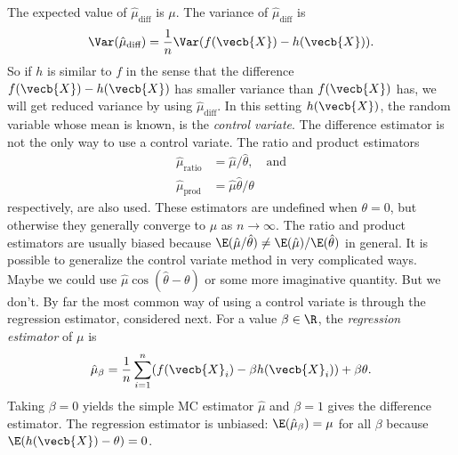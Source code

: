 The expected value of $\hat{\mu}_{\text{diff}}$ is $\mu$. The variance of $\hat{\mu}_{\text{diff}}$ is
\begin{equation}
	\Var(\hat{\mu}_{\text{diff}}) = \frac{1}{n} \Var(f(\vecb{X}) - h(\vecb{X})).
	\label{eq:DifferenceEstimatorVariance}
\end{equation}
So if $h$ is similar to $f$ in the sense that the difference $f(\vecb{X}) - h(\vecb{X})$ has smaller variance than $f(\vecb{X})$ has, we will get reduced variance by using $\hat{\mu}_{\text{diff}}$. In this setting $h(\vecb{X})$, the random variable whose mean is known, is the \textit{control variate}. The difference estimator is not the only way to use a control variate. The ratio and product estimators
\begin{align}
	\hat{\mu}_{\text{ratio}} & = \hat{\mu} / \hat{\theta}, \quad \text{and} \label{eq:RatioEstimator} \\
	\hat{\mu}_{\text{prod}}  & = \hat{\mu} \hat{\theta} / \theta \label{eq:ProductEstimator}
\end{align}
respectively, are also used. These estimators are undefined when $\theta = 0$, but otherwise they generally converge to $\mu$ as $n \to \infty$. The ratio and product estimators are usually biased because $\E(\hat{\mu} / \hat{\theta}) \neq \E(\hat{\mu}) / \E(\hat{\theta})$ in general. It is possible to generalize the control variate method in very complicated ways. Maybe we could use $\hat{\mu} \cos(\hat{\theta} - \theta)$ or some more imaginative quantity. But we don't. By far the most common way of using a control variate is through the regression estimator, considered next.
For a value $\beta \in \R$, the \textit{regression estimator} of $\mu$ is
\begin{equation}
	\hat{\mu}_{\beta} = \frac{1}{n} \sum_{i=1}^n (f(\vecb{X}_i) - \beta h(\vecb{X}_i)) + \beta \theta.
	\label{eq:RegressionEstimator}
\end{equation}
Taking $\beta = 0$ yields the simple MC estimator $\hat{\mu}$ and $\beta = 1$ gives the difference estimator. The regression estimator is unbiased: $\E(\hat{\mu}_{\beta}) = \mu$ for all $\beta$ because $\E(h(\vecb{X}) - \theta) = 0$.

